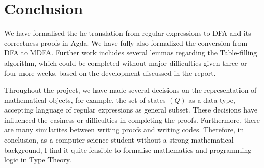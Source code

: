 \chapter{Conclusion}
\par We have formalised the he translation from regular expressions to DFA
and its correctness proofs in Agda. We have fully also formalized the
conversion from DFA to MDFA. Further work includes several lemmas regarding the Table-filling
algorithm, which could be completed without major difficulties given
three or four more weeks, based on the development discussed in the report.

\par Throughout the project, we have made several decisions on the
representation of mathematical objects, for example, the set of states
\((Q)\) as a data type, accepting language of regular expressions as
general subset. These decisions have influenced the easiness or
difficulties in completing the proofs. Furthermore, there are many
similarites between writing proofs and writing codes. Therefore, in
conclusion, as a computer
science student without a strong mathematical background, I find it
quite feasible to formalise mathematics and programming logic in
Type Theory. 